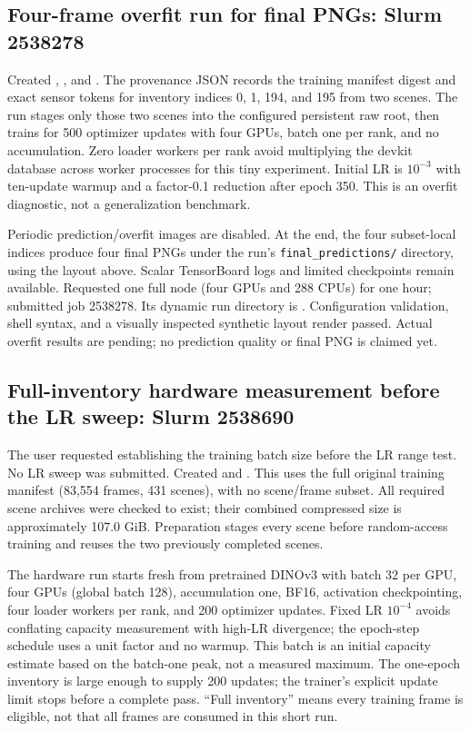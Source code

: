\documentclass[11pt,a4paper]{article}
\begin{document}
\subsection{Four-frame overfit run for final PNGs: Slurm 2538278}
Created , , and . The provenance JSON records the training manifest digest and exact sensor tokens for inventory indices 0, 1, 194, and 195 from two scenes. The run stages only those two scenes into the configured persistent raw root, then trains for 500 optimizer updates with four GPUs, batch one per rank, and no accumulation. Zero loader workers per rank avoid multiplying the devkit database across worker processes for this tiny experiment. Initial LR is $10^{-3}$ with ten-update warmup and a factor-0.1 reduction after epoch 350. This is an overfit diagnostic, not a generalization benchmark.

Periodic prediction/overfit images are disabled. At the end, the four subset-local indices produce four final PNGs under the run's \texttt{final\_predictions/} directory, using the layout above. Scalar TensorBoard logs and limited checkpoints remain available. Requested one full node (four GPUs and 288 CPUs) for one hour; submitted job 2538278. Its dynamic run directory is . Configuration validation, shell syntax, and a visually inspected synthetic layout render passed. Actual overfit results are pending; no prediction quality or final PNG is claimed yet.

\subsection{Full-inventory hardware measurement before the LR sweep: Slurm 2538690}
The user requested establishing the training batch size before the LR range test. No LR sweep was submitted. Created  and . This uses the full original training manifest (83,554 frames, 431 scenes), with no scene/frame subset. All required scene archives were checked to exist; their combined compressed size is approximately 107.0 GiB. Preparation stages every scene before random-access training and reuses the two previously completed scenes.

The hardware run starts fresh from pretrained DINOv3 with batch 32 per GPU, four GPUs (global batch 128), accumulation one, BF16, activation checkpointing, four loader workers per rank, and 200 optimizer updates. Fixed LR $10^{-4}$ avoids conflating capacity measurement with high-LR divergence; the epoch-step schedule uses a unit factor and no warmup. This batch is an initial capacity estimate based on the batch-one peak, not a measured maximum. The one-epoch inventory is large enough to supply 200 updates; the trainer's explicit update limit stops before a complete pass. ``Full inventory'' means every training frame is eligible, not that all frames are consumed in this short run.
\end{document}

